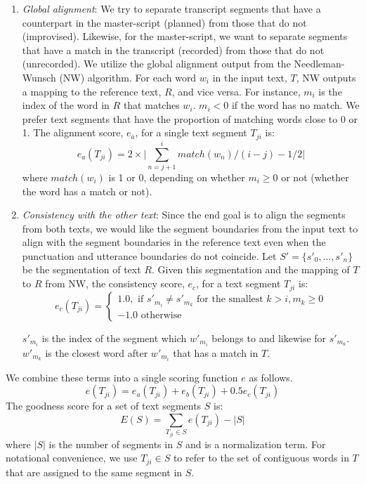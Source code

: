 \begin{enumerate}
\item{\textit{Global alignment}: We try to separate transcript segments that have a counterpart in the master-script (planned) from those that do not (improvised). Likewise, for the master-script, we want to separate segments that have a match in the transcript (recorded) from those that do not (unrecorded). We utilize the global alignment output from the Needleman-Wunsch (NW) algorithm. For each word $w_i$ in the input text, $T$, NW outputs a mapping 
to the reference text, $R$, and vice versa. For instance, $m_i$ is the index of the word in  $R$ that matches $w_i$. $m_i < 0$ if the word has no match. We prefer text segments that have the proportion of matching words close to 0 or 1. The alignment score, $e_a$, for a single text segment $T_{ji}$ is:  
\begin{equation}
e_{a}(T_{ji}) = 2\times\bigg|\sum_{n=j+1}^{i}{match(w_n)}\big/(i-j) - 1/2 \bigg|
\end{equation}
where $match(w_i)$ is 1 or 0, depending on whether $m_i \geq 0$ or not (whether the word has a match or not).
}
\item{\textit{Consistency with the other text}: Since the end goal is to align the segments from both texts, we would like the segment boundaries from the input text to align with the segment boundaries in the reference text even when the punctuation and utterance boundaries do not coincide. Let $S' = \{s'_0, \dots, s'_n\}$ be the segmentation of text $R$. Given this segmentation and the mapping of $T$ to $R$ from NW, the consistency score, $e_c$, for a text segment $T_{ji}$ is:
\begin{equation}
    e_c(T_{ji})= 
\begin{cases}
   1.0, \text{ if } s'_{m_i} \neq s'_{m_k} \text{ for the smallest } k>i, m_k \geq0\\
   -1.0 \text{ otherwise }
\end{cases}
\end{equation}

$s'_{m_i}$ is the index of the segment which $w'_{m_i}$ belongs to and likewise for $s'_{m_k}$. $w'_{m_k}$ is the closest word after $w'_{m_i}$ that has a match in $T$.
} 
\end{enumerate}

We combine these terms into a single scoring function $e$ as follows. 
\begin{equation}
e(T_{ji}) = e_a(T_{ji}) + e_b(T_{ji}) + 0.5  e_c(T_{ji})
\end{equation}
The goodness score for a set of text segments $S$ is:
\begin{equation}
E(S) = \sum_{T_{ji}\in S}{e(T_{ji})} - \big|S\big|
\end{equation}
where $\big|S\big|$ is the number of segments in $S$ and is a normalization term. For notational convenience, we use $T_{ji}\in S$ to refer to the set of contiguous words in $T$ that are assigned to the same segment in $S$. \\ 

